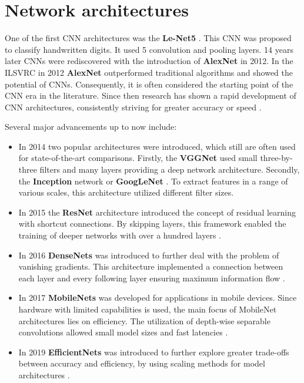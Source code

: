 \section{Network architectures}
\label{sec:networkArchitectures}

One of the first \ac{CNN} architectures was the \textbf{Le-Net5} \cite{LeNet5}.
This \ac{CNN} was proposed to classify handwritten digits.
It used 5 convolution and pooling layers.
14 years later \ac{CNN}s were rediscovered with the introduction of \textbf{AlexNet} \cite{AlexNet2012} in 2012.
In the \ac{ILSVRC} \cite{ILSVRC15} in 2012 \textbf{AlexNet} outperformed traditional algorithms and showed the potential of \ac{CNN}s.
Consequently, it is often considered the starting point of the \ac{CNN} era in the literature.
Since then research has shown a rapid development of \ac{CNN} architectures, consistently striving for greater accuracy or speed \cite{networkArchitectureSurvey}.

\vspace{1cm} %

\noindent Several major advancements up to now include:

\begin{itemize}
    \item In 2014 two popular architectures were introduced, which still are often used for state-of-the-art comparisons. Firstly, the \textbf{\ac{VGGNet}} \cite{VGGNet2015} used small three-by-three filters and many layers providing a deep network architecture. Secondly, the \textbf{Inception} network or \textbf{GoogLeNet} \cite{InceptionNet}. To extract features in a range of various scales, this architecture utilized different filter sizes.
    \item In 2015 the \textbf{ResNet} architecture \cite{ResNet} introduced the concept of residual learning with shortcut connections. By skipping layers, this framework enabled the training of deeper networks with over a hundred layers \cite{networkArchitectureSurvey}.
    \item In 2016 \textbf{DenseNets} \cite{DenseNets} was introduced to further deal with the problem of vanishing gradients. This architecture implemented a connection between each layer and every following layer ensuring maximum information flow \cite{networkArchitectureSurvey}.
    \item In 2017 \textbf{MobileNets} \cite{MobileNetV1} \cite{MobileNetV2} \cite{MobileNetV3} was developed for applications in mobile devices. Since hardware with limited capabilities is used, the main focus of MobileNet architectures lies on efficiency. The utilization of depth-wise separable convolutions allowed small model sizes and fast latencies \cite{networkArchitectureSurvey}.
    \item In 2019 \textbf{EfficientNets} \cite{EfficientNet} was introduced to further explore greater trade-offs between accuracy and efficiency, by using scaling methods for model architectures \cite{networkArchitectureSurvey}. 
\end{itemize}

